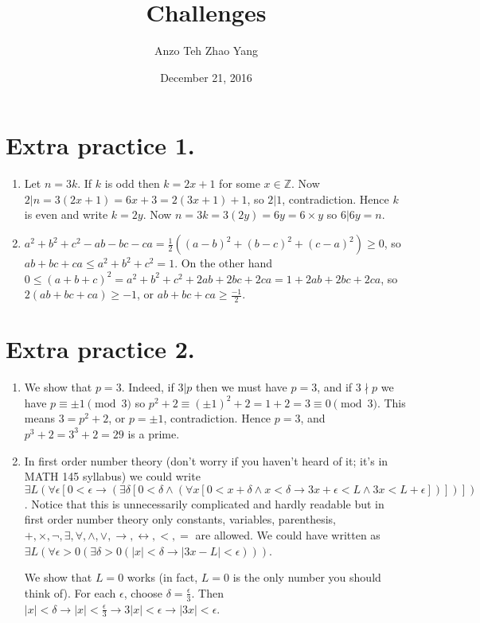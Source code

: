 \documentclass[11pt]{article}
\title{Challenges}
\author{ Anzo Teh Zhao Yang}
\date{December 21, 2016}
\begin{document}
\maketitle

\section {Extra practice 1.}
\begin{enumerate}
\item Let $n=3k$. If $k$ is odd then $k=2x+1$ for some $x\in\mathbb{Z}$. Now $2|n=3(2x+1)=6x+3=2(3x+1)+1$, so $2|1$, contradiction. Hence $k$ is even and write $k=2y$. Now $n=3k=3(2y)=6y=6\times y$ so $6|6y=n$.

\item $a^2+b^2+c^2-ab-bc-ca=\frac12((a-b)^2+(b-c)^2+(c-a)^2)\ge 0$, so $ab+bc+ca\le a^2+b^2+c^2=1$. On the other hand $0\le (a+b+c)^2=a^2+b^2+c^2+2ab+2bc+2ca=1+2ab+2bc+2ca$, so $2(ab+bc+ca)\ge -1$, or $ab+bc+ca\ge\frac{-1}{2}$.
\end{enumerate}

\section {Extra practice 2.}
\begin{enumerate}
\item We show that $p=3$. Indeed, if $3|p$ then we must have $p=3$, and if $3\nmid p$ we have $p\equiv \pm 1\pmod{3}$ so $p^2+2\equiv (\pm 1)^2+2=1+2=3\equiv 0\pmod {3}$. This means $3=p^2+2$, or $p=\pm 1$, contradiction. Hence $p=3$, and $p^3+2=3^3+2=29$ is a prime.

\item In first order number theory (don't worry if you haven't heard of it; it's in MATH 145 syllabus) we could write $\exists L(\forall\epsilon [0<\epsilon \to(\exists\delta [0<\delta\land (\forall x [0<x+\delta \land x<\delta\to 3x+\epsilon<L\land 3x<L+\epsilon ])])])$. Notice that this is unnecessarily complicated and hardly readable but in first order number theory only constants, variables, parenthesis, $+, \times, \neg, \exists, \forall, \land, \lor, \to, \leftrightarrow, <, =$ are allowed. We could have written as $\exists L(\forall \epsilon>0(\exists\delta>0 (|x|<\delta \to |3x-L|<\epsilon)))$.

We show that $L=0$ works (in fact, $L=0$ is the only number you should think of). For each $\epsilon$, choose $\delta=\frac{\epsilon}{3}$. Then $|x|<\delta\to |x|<\frac{\epsilon}{3}\to 3|x|<\epsilon \to |3x|<\epsilon$.

\end{enumerate}
\end{document}
